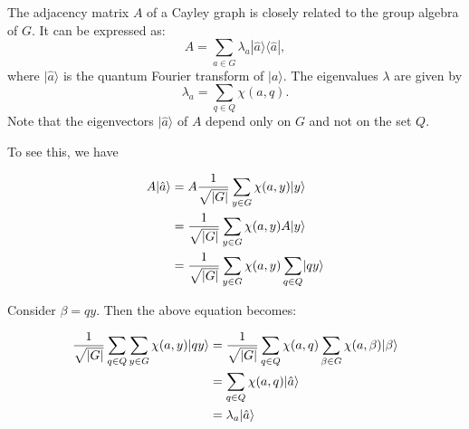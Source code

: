 \documentclass[12pt]{report}
\begin{document}
The adjacency matrix $A$ of a Cayley graph is closely related to the group algebra of $G$. It can be expressed as:
\[
A = \sum_{a \in G} \lambda_a |\hat{a}\rangle \langle \hat{a}|,
\]
where $|\hat{a}\rangle$ is the quantum Fourier transform of $|a\rangle$. The eigenvalues $\lambda$ are given by
\[
\lambda_a = \sum_{q \in Q} \chi(a, q).
\]
Note that the eigenvectors $|\hat{a}\rangle$ of $A$ depend only on $G$ and not on the set $Q$.

To see this, we have

        \begin{align}
            A\lvert\hat{a}\rangle 
            &= A\frac{1}{\sqrt{|G|}}\sum_{y \in G}\chi(a,y)\lvert y\rangle \nonumber \\
            &= \frac{1}{\sqrt{|G|}}\sum_{y \in G}\chi(a,y)A\lvert y\rangle \nonumber \\
            &= \frac{1}{\sqrt{|G|}}\sum_{y \in G}\chi(a,y)\sum_{q \in Q}\lvert qy\rangle \nonumber
            \end{align}
            
            \noindent Consider $\beta = qy$. Then the above equation becomes:
            
            \begin{align}
            \frac{1}{\sqrt{|G|}}\sum_{q \in Q} \sum_{y \in G} \chi(a,y)\lvert qy\rangle 
            &= \frac{1}{\sqrt{|G|}}\sum_{q \in Q} \chi(a,q) \sum_{\beta \in G} \chi(a,\beta)\lvert\beta\rangle \nonumber \\
            &= \sum_{q \in Q} \chi(a,q)\lvert\hat{a}\rangle \nonumber \\
            &= \lambda_a\lvert\hat{a}\rangle \label{eq:group_action_walk}
            \end{align}
            



\end{document}
